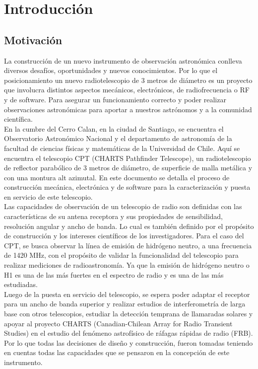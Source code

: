 \chapter{Introducción}
\section{Motivación}

La construcción de un nuevo instrumento de observación astronómica conlleva diversos desafíos, oportunidades y nuevos conocimientos. Por lo que el posicionamiento un nuevo radiotelescopio de 3 metros de diámetro es un proyecto que involucra distintos aspectos mecánicos, electrónicos, de radiofrecuencia o RF y de software. Para asegurar un funcionamiento correcto y poder realizar observaciones astronómicas para aportar a nuestros astrónomos y a la comunidad científica.\\

En la cumbre del Cerro Calan, en la ciudad de Santiago, se encuentra el Observatorio Astronómico Nacional y el departamento de astronomía de la facultad de ciencias físicas y matemáticas de la Universidad de Chile. Aquí se encuentra el telescopio CPT (CHARTS Pathfinder Telescope), un radiotelescopio de reflector parabólico de 3 metros de diámetro, de superficie de malla metálica y con una montura alt azimutal. En este documento se detalla el proceso de construcción mecánica, electrónica y de software para la caracterización y puesta en servicio de este telescopio.\\ 

Las capacidades de observación de un telescopio de radio son definidas con las características de su antena receptora y sus propiedades de sensibilidad, resolución angular y ancho de banda. Lo cual es también definido por el propósito de construcción y los intereses científicos de los investigadores. Para el caso del CPT, se busca observar la línea de emisión de hidrógeno neutro, a una frecuencia de 1420 MHz, con el propósito de validar la funcionalidad del telescopio para realizar mediciones de radioastronomía. Ya que la emisión de hidrógeno neutro o H1 es una de las más fuertes en el espectro de radio y es una de las más estudiadas.\\

Luego de la puesta en servicio del telescopio, se espera poder adaptar el receptor para un ancho de banda superior y realizar estudios de interferometría de larga base con otros telescopios, estudiar la detección temprana de llamaradas solares y apoyar al proyecto CHARTS (Canadian-Chilean Array for Radio Transient Studies) en el estudio del fenómeno astrofísico de ráfagas rápidas de radio (FRB). Por lo que todas las decisiones de diseño y construcción, fueron tomadas teniendo en cuentas todas las capacidades que se pensaron en la concepción de este instrumento.\\

